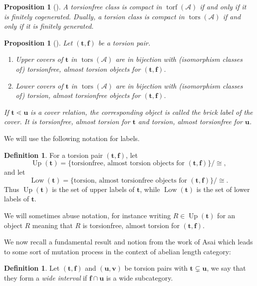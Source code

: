 \documentclass[11pt]{amsart}
\newtheorem{proposition}[theorem]{Proposition}
\theoremstyle{definition}
\newtheorem{definition}[theorem]{Definition}
\newcommand{\A}{\mathcal A}
\newcommand{\tors}{\operatorname{tors}}
\newcommand{\torf}{\operatorname{torf}}
\newcommand{\Up}{\operatorname{Up}}
\newcommand{\Low}{\operatorname{Low}}
\newcommand{\tpair}[2]{(\mathbf{#1}, \mathbf{#2})  }
\begin{document}
\begin{proposition}[{\cite[Proposition 3.2]{DIRRT}}]\label{prop:compact-finitely-generated}
A torsionfree class is compact in \(\torf(\A)\) if and only if it is finitely cogenerated. Dually, a torsion class is compact in \(\tors(\A)\) if and only if it is finitely generated.
\end{proposition}

\begin{proposition}[{\cite[Theorem 1.0.2, Theorem 2.3.2]{BCZ}}]\label{prop:brick-labels-covers}
Let \((\mathbf t,\mathbf f)\) be a torsion pair.
\begin{enumerate}[label=\textup{(\arabic*)},leftmargin=2.5em]
\item Upper covers of \(\mathbf t\) in \(\tors(\A)\) are in bijection with (isomorphism classes of) torsionfree, almost torsion objects for \((\mathbf t,\mathbf f)\).
\item Lower covers of \(\mathbf t\) in \(\tors(\A)\) are in bijection with (isomorphism classes of) torsion, almost torsionfree objects for \((\mathbf t,\mathbf f)\).
\end{enumerate}
If \(\mathbf t\lessdot \mathbf u\) is a cover relation, the corresponding object is called the brick label of the cover. It is torsionfree, almost torsion for \(\mathbf t\) and torsion, almost torsionfree for \(\mathbf u\).
\end{proposition}

We will use the following notation for labels.

\begin{definition}
For a torsion pair \((\mathbf t,\mathbf f)\), let
\[
\Up(\mathbf t)=\{\text{torsionfree, almost torsion objects for }(\mathbf t,\mathbf f)\}/\cong,
\]
and let
\[
\Low(\mathbf t)=\{\text{torsion, almost torsionfree objects for }(\mathbf t,\mathbf f)\}/\cong.
\]
Thus \(\Up(\mathbf t)\) is the set of upper labels of \(\mathbf t\), while \(\Low(\mathbf t)\) is the set of lower labels of \(\mathbf t\).

We will sometimes abuse notation, for instance writing $ R \in \Up(\mathbf{t}) $ for an object \( R \) meaning that \( R \) is torsionfree, almost torsion for \( \tpair{t}{f} \).
\end{definition}

We now recall a fundamental result and notion from the work of Asai which leads to some sort of mutation process in the context of abelian length category:

\begin{definition}
Let \((\mathbf t,\mathbf f)\) and \((\mathbf u,\mathbf v)\) be torsion pairs with \( \mathbf{t} \subsetneq \mathbf{u} \), we say that they form a \emph{wide interval} if \( \mathbf{f} \cap \mathbf{u} \) is a wide subcategory.
\end{definition}
\end{document}
